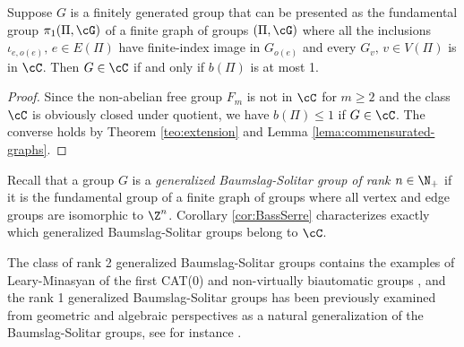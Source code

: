 \documentclass[reqno]{amsart}
\begin{document}

\begin{cor}\label{cor:BassSerre}
Suppose $G$ is a finitely generated group that can be presented as the fundamental group $\pi_1(\Pi, \cG)$ of a finite graph of groups $(\Pi, \cG)$ where all the inclusions $\iota_{e, o(e)},\, e \in E(\Pi)$ have finite-index image in $G_{o(e)}$ and every $G_v, \, v \in V(\Pi)$ is in $\cC$. Then $G \in \cC$ if and only if $b(\Pi)$ is at most 1.
\end{cor}
\begin{proof}
Since the non-abelian free group $F_m$ is not in $\cC$ for $m\ge 2$ and the class $\cC$ is obviously closed under quotient, we have $b(\Pi) \leq 1$ if $G \in \cC$. The converse holds by Theorem \ref{teo:extension} and  Lemma \ref{lema:commensurated-graphs}.
\end{proof}

\begin{ejm}
Recall that a group $G$ is a \emph{generalized Baumslag-Solitar group of rank $n \in \N_+$} if it is the fundamental group of a finite graph of groups where all vertex and edge groups are isomorphic to $\Z^n$.  Corollary \ref{cor:BassSerre} characterizes exactly which generalized Baumslag-Solitar groups belong to $\cC$.

The class of rank 2 generalized Baumslag-Solitar groups contains the examples of Leary-Minasyan of the first CAT(0) and non-virtually biautomatic groups \cite{LearyMinasyan2021}, and the rank 1 generalized Baumslag-Solitar groups has been previously examined from geometric and algebraic perspectives as a natural generalization of the Baumslag-Solitar groups, see for instance \cite{Whyte2001, levittAutomorphisms}.
\end{ejm}
\end{document}
